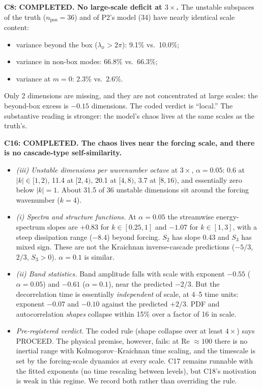 \documentclass[11pt]{article}
\begin{document}
\textbf{C8: COMPLETED. No large-scale deficit at $3\times$.} The unstable
subspaces of the truth ($n_{\mathrm{pos}}{=}36$) and of P2's model (34)
have nearly identical scale content:
\begin{itemize}[leftmargin=*]
\item variance beyond the box ($\lambda_x>2\pi$): 9.1\% vs.\ 10.0\%;
\item variance in non-box modes: 66.8\% vs.\ 66.3\%;
\item variance at $m{=}0$: 2.3\% vs.\ 2.6\%.
\end{itemize}
Only 2 dimensions are missing, and they are not concentrated at large
scales: the beyond-box excess is $-0.15$ dimensions. The coded verdict is
``local.'' The substantive reading is stronger: the model's chaos lives
at the same scales as the truth's.

\textbf{C16: COMPLETED. The chaos lives near the forcing scale, and there
is no cascade-type self-similarity.}
\begin{itemize}[leftmargin=*]
\item \emph{(iii) Unstable dimensions per wavenumber octave} at $3\times$,
  $\alpha{=}0.05$: 0.6 at $|k|\in[1,2)$, 11.4 at $[2,4)$, 20.1 at
  $[4,8)$, 3.7 at $[8,16)$, and essentially zero below $|k|{=}1$. About
  31.5 of 36 unstable dimensions sit around the forcing wavenumber
  ($k{=}4$).
\item \emph{(i) Spectra and structure functions.} At $\alpha{=}0.05$ the
  streamwise energy-spectrum slopes are $+0.83$ for $k\in[0.25,1]$ and
  $-1.07$ for $k\in[1,3]$, with a steep dissipation range ($-8.4$)
  beyond forcing. $S_2$ has slope 0.43 and $S_3$ has mixed sign. These
  are not the Kraichnan inverse-cascade predictions ($-5/3$, $2/3$,
  $S_3>0$). $\alpha{=}0.1$ is similar.
\item \emph{(ii) Band statistics.} Band amplitude falls with scale with
  exponent $-0.55$ ($\alpha{=}0.05$) and $-0.61$ ($\alpha{=}0.1$), near
  the predicted $-2/3$. But the decorrelation time is essentially
  \emph{independent} of scale, at 4--5 time units: exponent $-0.07$ and
  $-0.10$ against the predicted $+2/3$. PDF and autocorrelation
  \emph{shapes} collapse within 15\% over a factor of 16 in scale.
\item \emph{Pre-registered verdict.} The coded rule (shape collapse over
  at least $4\times$) says PROCEED. The physical premise, however, fails:
  at Re $\approx100$ there is no inertial range with
  Kolmogorov--Kraichnan time scaling, and the timescale is set by the
  forcing-scale dynamics at every scale. C17 remains runnable with the
  fitted exponents (no time rescaling between levels), but C18's
  motivation is weak in this regime. We record both rather than
  overriding the rule.
\end{itemize}
\end{document}
